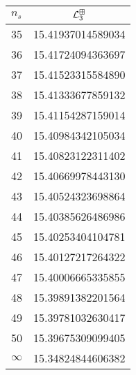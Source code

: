 \begin{tabular}[t]{lc}
\toprule
  $n_{s}$ &  $\mathcal L^{\boxplus}_3$ \\ \toprule
\midrule
       35 &                   15.41937014589034 \\
       36 &                   15.41724094363697 \\
       37 &                   15.41523315584890 \\
       38 &                   15.41333677859132 \\
       39 &                   15.41154287159014 \\
       40 &                   15.40984342105034 \\
       41 &                   15.40823122311402 \\
       42 &                   15.40669978443130 \\
       43 &                   15.40524323698864 \\
       44 &                   15.40385626486986 \\
       45 &                   15.40253404104781 \\
       46 &                   15.40127217264322 \\
       47 &                   15.40006665335855 \\
       48 &                   15.39891382201564 \\
       49 &                   15.39781032630417 \\
       50 &                   15.39675309099405 \\
 $\infty$ &                   15.34824844606382 \\
\bottomrule
\end{tabular}
